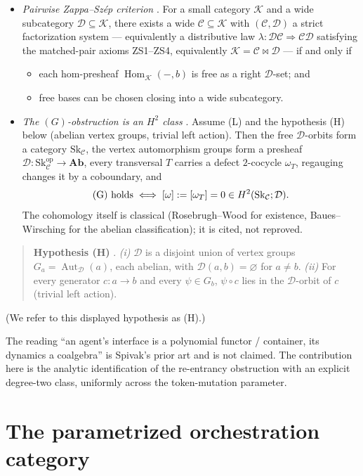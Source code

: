 \documentclass[11pt]{article}
\theoremstyle{definition}
\newcommand{\Hom}{\operatorname{Hom}}
\newcommand{\Aut}{\operatorname{Aut}}
\newcommand{\C}{\mathcal{C}}
\newcommand{\D}{\mathcal{D}}
\newcommand{\K}{\mathcal{K}}
\newcommand{\Sk}{\mathrm{Sk}}
\newcommand{\Ab}{\mathbf{Ab}}
\begin{document}
\begin{itemize}
\item[\textbf{(T2)}] \emph{Pairwise Zappa--Sz\'ep criterion} \cite{pairwise}. For a
small category $\K$ and a wide subcategory $\D\subseteq\K$, there exists a wide
$\C\subseteq\K$ with $(\C,\D)$ a strict factorization system --- equivalently a
distributive law $\lambda:\D\C\Rightarrow\C\D$ satisfying the matched-pair axioms
ZS1--ZS4, equivalently $\K=\C\bowtie\D$ --- if and only if
\begin{itemize}
\item[\textnormal{(L)}] each hom-presheaf $\Hom_\K(-,b)$ is free as a right
$\D$-set; and
\item[\textnormal{(G)}] free bases can be chosen closing into a wide subcategory.
\end{itemize}
\item[\textbf{(T3)}] \emph{The $(G)$-obstruction is an $H^2$ class} \cite{gobstr}.
Assume \textnormal{(L)} and the hypothesis (H) below (abelian vertex groups,
trivial left action). Then the free $\D$-orbits form a category $\Sk_\C$, the vertex
automorphism groups form a presheaf $\D:\Sk_\C^{\mathrm{op}}\to\Ab$, every
transversal $T$ carries a defect $2$-cocycle $\omega_T$, regauging changes it by a
coboundary, and
\[
   \textnormal{(G) holds}\iff[\omega]:=[\omega_T]=0\in H^2(\Sk_\C;\D).
\]
The cohomology itself is classical (Rosebrugh--Wood \cite{rw} for existence,
Baues--Wirsching \cite{bw} for the abelian classification); it is cited, not
reproved.
\end{itemize}

\begin{quote}\small
\textbf{Hypothesis \textnormal{(H)}} \cite{gobstr}. \emph{(i)} $\D$ is a disjoint
union of vertex groups $G_a=\Aut_\D(a)$, each abelian, with $\D(a,b)=\varnothing$
for $a\neq b$. \emph{(ii)} For every generator $c:a\to b$ and every $\psi\in G_b$,
$\psi\circ c$ lies in the $\D$-orbit of $c$ (trivial left action).
\end{quote}

\noindent(We refer to this displayed hypothesis as (H).)

The reading ``an agent's interface is a polynomial functor / container, its dynamics
a coalgebra'' is Spivak's prior art and is not claimed. The contribution here is the
analytic identification of the re-entrancy obstruction with an explicit degree-two
class, uniformly across the token-mutation parameter.

\section{The parametrized orchestration category}\label{sec:model}
\end{document}
